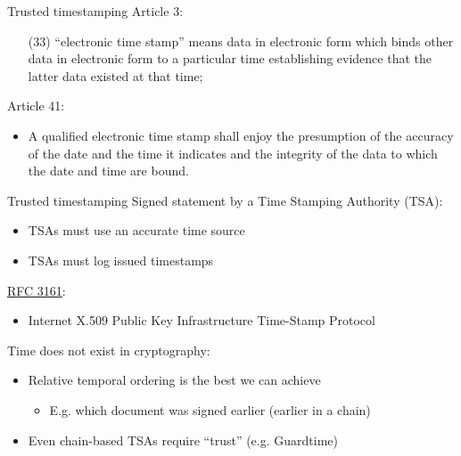 \begin{frame}{Trusted timestamping}
  \pause
  Article 3:
  \settowidth{\offset}{33}
  \addtolength{\leftmargini}{\offset}
  \begin{enumerate}
    \item[(33)] \enquote{electronic time stamp} means data in electronic form which binds other data in electronic form to a particular time establishing evidence that the latter data existed at that time;
  \end{enumerate}

  \pause
  Article 41:
  \begin{itemize}
    \setcounter{enumi}{1}
    \item A qualified electronic time stamp shall enjoy the presumption of the accuracy of the date and the time it indicates and the integrity of the data to which the date and time are bound.
  \end{itemize}
\end{frame}

\begin{frame}{Trusted timestamping}
  \pause
  Signed statement by a Time Stamping Authority (TSA):
  \begin{itemize}[<+(1)->]
    \item TSAs must use an accurate time source
    \item TSAs must log issued timestamps
  \end{itemize}

  \pause
  \href{https://datatracker.ietf.org/doc/html/rfc3161}{RFC 3161}:
  \begin{itemize}[<+(1)->]
    \item Internet X.509 Public Key Infrastructure Time-Stamp Protocol
  \end{itemize}

  \pause
  Time does not exist in cryptography:
  \begin{itemize}[<+(1)->]
    \item Relative temporal ordering is the best we can achieve
    \begin{itemize}
      \item E.g. which document was signed earlier (earlier in a chain)
    \end{itemize}
    \item Even chain-based TSAs require \enquote{trust} (e.g. Guardtime)
  \end{itemize}
\end{frame}

